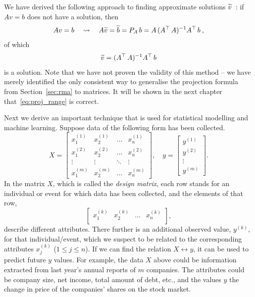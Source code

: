 \begin{application}
	We have derived the following approach to finding approximate solutions $\widetilde{v}$~: if $Av=b$ does not have a solution, then
	\[ Av=b \quad \leadsto \quad A\widetilde{v}=\widetilde{b} = P_A \, b 
	= A \, (A^\top \, A)^{-1} A^\top \, b \:, \]
	of which
	\begin{equation}
	\label{eq:proj_range}
	\widetilde{v} = (A^\top \, A)^{-1} A^\top \, b
	\end{equation}
	is a solution. Note that we have not proven the validity of this method -- we have merely identified the only consistent way to generalise the projection formula from Section~\ref{sec:rma} to matrices. It will be shown in the next chapter that~\eqref{eq:proj_range} is correct. 
\end{application}

\begin{application}
	Next we derive an important technique that is used for statistical modelling and machine learning. Suppose data of the following form has been collected.
	\[ X = \begin{bmatrix}
	x_1^{(1)} & x_2^{(1)} & \dots & x_n^{(1)} \\
	x_1^{(2)} & x_2^{(2)} & \dots & x_n^{(2)} \\
	\vdots & \vdots & \ddots & \vdots \\
	x_1^{(m)} & x_2^{(m)} & \dots & x_n^{(m)}
	\end{bmatrix}, \quad y = \begin{bmatrix}
	y^{(1)} \\ y^{(2)} \\ \vdots \\ y^{(m)} 
	\end{bmatrix}. \]
	In the matrix $X$, which is called the \emph{design matrix}, each row stands for an individual or event for which data has been collected, and the elements of that row, 
	\[ \begin{bmatrix}
	x_1^{(k)} & x_2^{(k)} & \dots & x_n^{(k)} \\
	\end{bmatrix},\]
	describe different attributes. There further is an additional observed value, $y^{(k)}$, for that individual/event, which we suspect to be related to the corresponding attributes $x_j^{(k)}$ ($1 \leq j \leq n$). If we can find the relation $X \leftrightarrow y$, it can be used to predict future $y$ values. For example, the data $X$ above could be information extracted from last year's annual reports of $m$ companies. The attributes could be company size, net income, total amount of debt, etc., and the values $y$ the change in price of the companies' shares on the stock market. 
	

\end{application}
